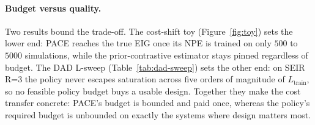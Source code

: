 \paragraph{Budget versus quality.} Two results bound the trade-off. The cost-shift toy
(Figure~\ref{fig:toy}) sets the lower end: PACE reaches the true EIG once its NPE is
trained on only $500$ to $5000$ simulations, while the prior-contrastive estimator stays
pinned regardless of budget. The DAD L-sweep (Table~\ref{tab:dad-sweep}) sets the other
end: on SEIR R=3 the policy never escapes saturation across five orders of magnitude of
$L_{\mathrm{train}}$, so no feasible policy budget buys a usable design. Together they
make the cost transfer concrete: PACE's budget is bounded and paid once, whereas the
policy's required budget is unbounded on exactly the systems where design matters most.
